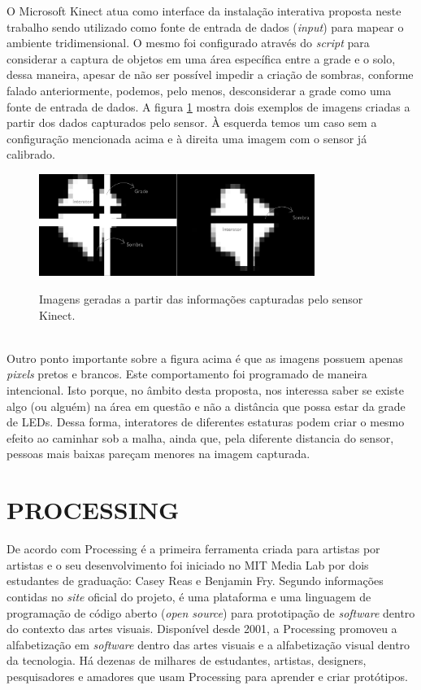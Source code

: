 O Microsoft Kinect atua como interface da instalação interativa proposta neste trabalho sendo utilizado como fonte de entrada de dados (\textit{input}) para mapear o ambiente tridimensional. O mesmo foi configurado através do \textit{script} para considerar a captura de objetos em uma área específica entre a grade e o solo, dessa maneira, apesar de não ser possível impedir a criação de sombras, conforme falado anteriormente, podemos, pelo menos, desconsiderar a grade como uma fonte de entrada de dados. A figura \ref{fig:kinect_exemplo} mostra dois exemplos de imagens criadas a partir dos dados capturados pelo sensor. À esquerda temos um caso sem a configuração mencionada acima e à direita uma imagem com o sensor já calibrado.

\begin{figure}[H]
    \centering
    \caption{Imagens geradas a partir das informações capturadas pelo sensor Kinect.}
	\vspace*{0,2cm}
    \includegraphics[width=0.8\textwidth]{./04-figuras/kinect_exemplo}
    \label{fig:kinect_exemplo}
\end{figure}
\vspace*{-0,9cm}
{\raggedright {}}\\

Outro ponto importante sobre a figura acima é que as imagens possuem apenas \textit{pixels} pretos e brancos. Este comportamento foi programado de maneira intencional. Isto porque, no âmbito desta proposta, nos interessa saber se existe algo (ou alguém) na área em questão e não a distância que possa estar da grade de LEDs. Dessa forma, interatores de diferentes estaturas podem criar o mesmo efeito ao caminhar sob a malha, ainda que, pela diferente distancia do sensor, pessoas mais baixas pareçam menores na imagem capturada.


\section{PROCESSING}

De acordo com  Processing é a primeira ferramenta criada para artistas por artistas e o seu desenvolvimento foi iniciado no MIT Media Lab por dois estudantes de graduação: Casey Reas e Benjamin Fry. Segundo informações contidas no \textit{site} oficial do projeto,  é uma plataforma e uma linguagem de programação de código aberto (\textit{open source}) para prototipação de \textit{software} dentro do contexto das artes visuais. Disponível desde 2001, a Processing promoveu a alfabetização em \textit{software} dentro das artes visuais e a alfabetização visual dentro da tecnologia. Há dezenas de milhares de estudantes, artistas, designers, pesquisadores e amadores que usam Processing para aprender e criar protótipos.

